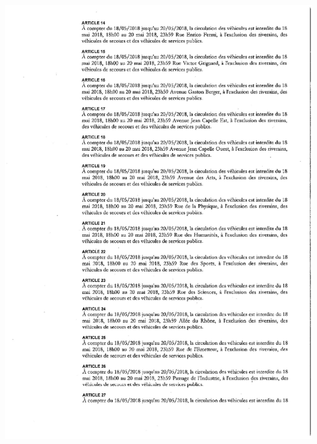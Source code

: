 \documentclass[hidelinks, paper=a4, fontsize=13pt]{report}
\begin{document}
\begin{center}
\includegraphics[scale = 0.7]{Annexes/Documents/VilleurbanneCirculation3}

\end{center}
\end{document}
